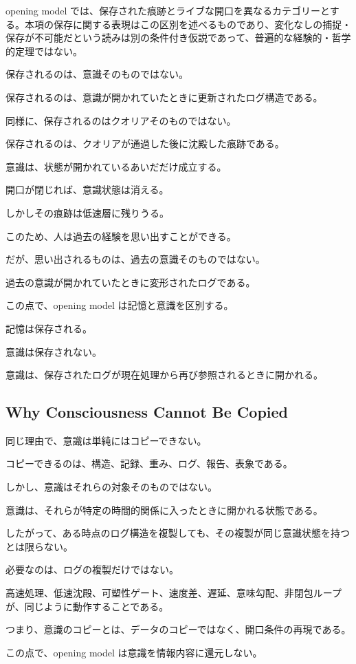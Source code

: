 opening model では、保存された痕跡とライブな開口を異なるカテゴリーとする。本項の保存に関する表現はこの区別を述べるものであり、変化なしの捕捉・保存が不可能だという読みは別の条件付き仮説であって、普遍的な経験的・哲学的定理ではない。

保存されるのは、意識そのものではない。

保存されるのは、意識が開かれていたときに更新されたログ構造である。

同様に、保存されるのはクオリアそのものではない。

保存されるのは、クオリアが通過した後に沈殿した痕跡である。

意識は、状態が開かれているあいだだけ成立する。

開口が閉じれば、意識状態は消える。

しかしその痕跡は低速層に残りうる。

このため、人は過去の経験を思い出すことができる。

だが、思い出されるものは、過去の意識そのものではない。

過去の意識が開かれていたときに変形されたログである。

この点で、opening model は記憶と意識を区別する。

記憶は保存される。

意識は保存されない。

意識は、保存されたログが現在処理から再び参照されるときに開かれる。

\subsection{Why Consciousness Cannot Be Copied}

同じ理由で、意識は単純にはコピーできない。

コピーできるのは、構造、記録、重み、ログ、報告、表象である。

しかし、意識はそれらの対象そのものではない。

意識は、それらが特定の時間的関係に入ったときに開かれる状態である。

したがって、ある時点のログ構造を複製しても、その複製が同じ意識状態を持つとは限らない。

必要なのは、ログの複製だけではない。

高速処理、低速沈殿、可塑性ゲート、速度差、遅延、意味勾配、非閉包ループが、同じように動作することである。

つまり、意識のコピーとは、データのコピーではなく、開口条件の再現である。

この点で、opening model は意識を情報内容に還元しない。

